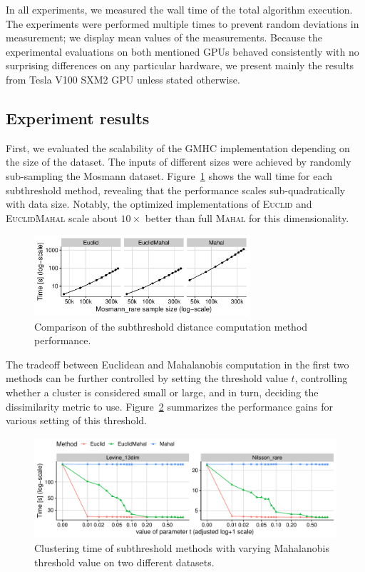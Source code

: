 In all experiments, we measured the wall time of the total algorithm execution.
The experiments were performed multiple times to prevent random deviations in measurement; we display mean values of the measurements.
Because the experimental evaluations on both mentioned GPUs behaved consistently with no surprising differences on any particular hardware, we present mainly the results from Tesla V100 SXM2 GPU unless stated otherwise.

\subsection{Experiment results}\label{sec:exp}

First, we evaluated the scalability of the GMHC implementation depending on the size of the dataset.
The inputs of different sizes were achieved by randomly sub-sampling the Mosmann dataset.
Figure~\ref{fig:perf_methods} shows the wall time for each subthreshold method, revealing that the performance scales sub-quadratically with data size.
Notably, the optimized implementations of \textsc{Euclid} and \textsc{EuclidMahal} scale about $10\times$ better than full \textsc{Mahal} for this dimensionality.

\begin{figure}[t]
	\centering
	\includegraphics[width=8cm]{Mahalanobis/img/methods.pdf}
	\caption{Comparison of the subthreshold distance computation method performance.}
	\label{fig:perf_methods}
\end{figure}

The tradeoff between Euclidean and Mahalanobis computation in the first two methods can be further controlled by setting the threshold value $t$, controlling whether a cluster is considered small or large, and in turn, deciding the dissimilarity metric to use.
Figure~\ref{fig:perf_thresh} summarizes the performance gains for various setting of this threshold.

\begin{figure}[t]
	\centering
	\includegraphics[width=12cm]{Mahalanobis/img/thresh.pdf}
	\caption{Clustering time of subthreshold methods with varying Mahalanobis threshold value on two different datasets.}
	\label{fig:perf_thresh}
\end{figure}

